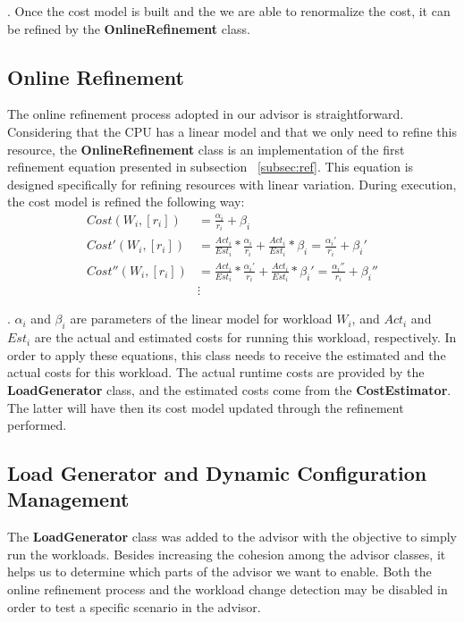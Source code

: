 . Once the cost model is built and the we are able to renormalize the cost, it can be refined by the \textbf{OnlineRefinement} class.

\subsection{Online Refinement}

The online refinement process adopted in our advisor is straightforward. Considering that the CPU has a linear model and that we only need to refine this resource, the \textbf{OnlineRefinement} class  is an implementation of the first refinement equation presented in subsection ~\ref{subsec:ref}. This equation is designed specifically for refining resources with linear variation. During execution, the cost model is refined the following way:
\begin{equation}
 \begin{split}
   Cost(W_{i}, [r_{i}]) & = \frac{\alpha_{i}}{r_{i}} +\beta_{i} \\
   Cost'(W_{i}, [r_{i}]) & = \frac{Act_{i}}{Est_{i}} * \frac{\alpha_{i}}{r_{i}} + \frac{Act_{i}}{Est_{i}} * \beta_{i} = \frac{\alpha_{i}'}{r_{i}} +\beta_{i}' \\
   Cost''(W_{i}, [r_{i}]) & = \frac{Act_{i}}{Est_{i}} * \frac{\alpha_{i}'}{r_{i}} + \frac{Act_{i}}{Est_{i}} * \beta_{i}' = \frac{\alpha_{i}''}{r_{i}} +\beta_{i}'' \\
    & \vdots
 \end{split}
\end{equation}

 . $\alpha_{i}$ and $\beta_{i}$ are parameters of the linear model for workload $W_{i}$, and $Act_{i}$ and $Est_{i}$ are the actual and estimated costs for running this workload, respectively. In order to apply these equations, this class needs to receive the estimated and the actual costs for this workload. The actual runtime costs are provided by the \textbf{LoadGenerator} class, and the estimated costs come from the \textbf{CostEstimator}. The latter will have then its cost model updated through the refinement performed.

\subsection{Load Generator and Dynamic Configuration Management}

The \textbf{LoadGenerator} class was added to the advisor with the objective to simply run the workloads. Besides increasing the cohesion among the advisor classes, it helps us to determine which parts of the advisor we want to enable. Both the online refinement process and the workload change detection may be disabled in order to test a specific scenario in the advisor.

